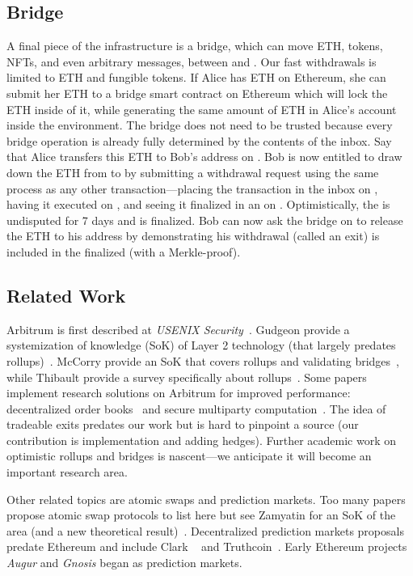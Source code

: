 \subsection{Bridge} A final piece of the \layertwo infrastructure is a bridge, which can move ETH, tokens, NFTs, and even arbitrary messages, between \layerone and \layertwo. Our fast withdrawals is limited to ETH and fungible tokens. If Alice has ETH on Ethereum, she can submit her ETH to a bridge smart contract on Ethereum which will lock the ETH inside of it, while generating the same amount of ETH in Alice's account inside the \layertwo environment. The bridge does not need to be trusted because every bridge operation is already fully determined by the contents of the inbox. Say that Alice transfers this ETH to Bob's address on \layertwo. Bob is now entitled to draw down the ETH from \layertwo to \layerone by submitting a withdrawal request using the same process as any other \layertwo transaction---\ie placing the transaction in the inbox on \layerone, having it executed on \layertwo, and seeing it finalized in an \rblock on \layerone. Optimistically, the \rblock is undisputed for 7 days and is finalized. Bob can now ask the bridge on \layerone to release the ETH to his address by demonstrating his withdrawal (called an exit) is included in the finalized \rblock (\eg with a Merkle-proof).

\subsection{Related Work} 

Arbitrum is first described at \textit{USENIX Security}~\cite{kalodner2018arbitrum}. Gudgeon \etal provide a systemization of knowledge (SoK) of Layer 2 technology (that largely predates rollups)~\cite{gudgeon2019sok}. McCorry \etal provide an SoK that covers rollups and validating bridges~\cite{mccorry2021sok}, while Thibault \etal provide a survey specifically about rollups~\cite{Tre22}. Some papers implement research solutions on Arbitrum for improved performance:  decentralized order books~\cite{moosavi2021lissy} and secure multiparty computation~\cite{demirag2021absentia}. The idea of tradeable exits predates our work but is hard to pinpoint a source (our contribution is implementation and adding hedges). Further academic work on optimistic rollups and bridges is nascent---we anticipate it will become an important research area.  

Other related topics are atomic swaps and prediction markets. Too many papers propose atomic swap protocols to list here but see Zamyatin \etal for an SoK of the area (and a new theoretical result)~\cite{zamyatin2021sok}. Decentralized prediction markets proposals predate Ethereum and include Clark \etal~\cite{clark2014decentralizing} and Truthcoin~\cite{sztorc2015truthcoin}. Early Ethereum projects \textit{Augur} and \textit{Gnosis} began as prediction markets. 

